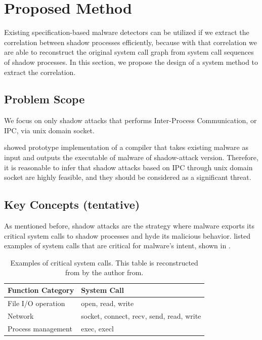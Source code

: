 \section{Proposed Method}
Existing specification-based malware detectors can be utilized if we extract
the correlation between shadow processes efficiently, because with that correlation
we are able to reconstruct the original system call graph from system call sequences
of shadow processes. In this section, we propose the design of a system method to extract the correlation.

\subsection{Problem Scope}
We focus on only shadow attacks that performs Inter-Process Communication, or IPC, via unix domain socket.

\cite{Weiqin:ShadowAttack} showed prototype implementation of a compiler
that takes existing malware as input and outputs the executable of malware of shadow-attack version.
Therefore, it is reasonable to infer that shadow attacks based on IPC through unix domain socket
are highly feasible, and they should be considered as a significant threat.

\subsection{Key Concepts (tentative)}
As mentioned before, shadow attacks are the strategy where malware exports its critical system calls
to shadow processes and hyde its malicious behavior.
\cite{Weiqin:ShadowAttack} listed examples of system calls that are critical for malware's intent,
shown in .

\begin{table}[t]
  \caption{Examples of critical system calls. This table is reconstructed from \cite{Weiqin:ShadowAttack} by the author from.}
  \centering
  \begin{tabular}{|l|l|}
    \hline
    \textbf{Function Category} & \textbf{System Call}                     \\
    \hline
    File I/O operation         & open, read, write                        \\
    \hline
    Network                    & socket, connect, recv, send, read, write \\
    \hline
    Process management         & exec, execl                              \\
    \hline
  \end{tabular}
  \label{tab:critical-system-calls}
\end{table}

